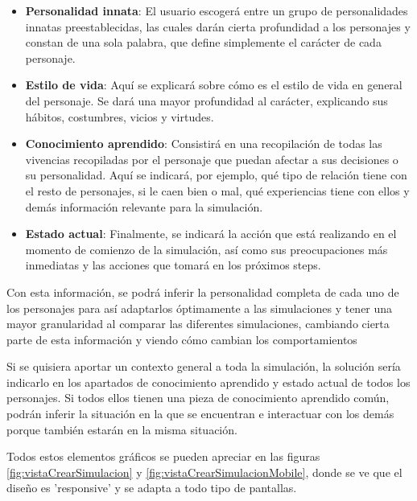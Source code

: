\begin{itemize}
	
	\item \textbf{Personalidad innata}: El usuario escogerá entre un grupo de personalidades innatas preestablecidas, las cuales darán cierta profundidad a los personajes y constan de una sola palabra, que define simplemente el carácter de cada personaje.
	
	\item \textbf{Estilo de vida}: Aquí se explicará sobre cómo es el estilo de vida en general del personaje. Se dará una mayor profundidad al carácter, explicando sus hábitos, costumbres, vicios y virtudes.
	
	\item \textbf{Conocimiento aprendido}: Consistirá en una recopilación de todas las vivencias recopiladas por el personaje que puedan afectar a sus decisiones o su personalidad. Aquí se indicará, por ejemplo, qué tipo de relación tiene con el resto de personajes, si le caen bien o mal, qué experiencias tiene con ellos y demás información relevante para la simulación.
	
	\item \textbf{Estado actual}: Finalmente, se indicará la acción que está realizando en el momento de comienzo de la simulación, así como sus preocupaciones más inmediatas y las acciones que tomará en los próximos steps.
	
\end{itemize}

Con esta información, se podrá inferir la personalidad completa de cada uno de los personajes para así adaptarlos óptimamente a las simulaciones y tener una mayor granularidad al comparar las diferentes simulaciones, cambiando cierta parte de esta información y viendo cómo cambian los comportamientos

Si se quisiera aportar un contexto general a toda la simulación, la solución sería indicarlo en los apartados de conocimiento aprendido y estado actual de todos los personajes. Si todos ellos tienen una pieza de conocimiento aprendido común, podrán inferir la situación en la que se encuentran e interactuar con los demás porque también estarán en la misma situación.

Todos estos elementos gráficos se pueden apreciar en las figuras \ref{fig:vistaCrearSimulacion} y \ref{fig:vistaCrearSimulacionMobile}, donde se ve que el diseño es 'responsive' y se adapta a todo tipo de pantallas.

